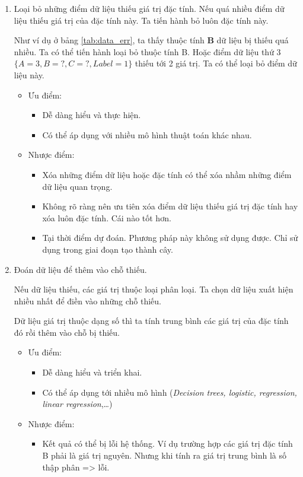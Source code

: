 \documentclass[../main-report.tex]{subfiles}
\begin{document}
\begin{enumerate}
\item Loại bỏ những điểm dữ liệu thiếu giá trị đặc tính. Nếu quá nhiều điểm dữ liệu thiếu giá trị của đặc tính này. Ta tiến hành bỏ luôn đặc tính này.

Như ví dụ ở bảng \ref{tab:data_err}, ta thấy thuộc tính \textbf{B} dữ liệu bị thiếu quá nhiều. Ta có thể tiến hành loại bỏ thuộc tính B. Hoặc điểm dữ liệu thứ 3 $\{A=3, B=?, C=?, Label=1 \}$ thiếu tới 2 giá trị. Ta có thể loại bỏ điểm dữ liệu này.

\begin{itemize}
\item Ưu điểm:
\begin{itemize}
\item Dễ dàng hiểu và thực hiện.
\item Có thể áp dụng với nhiều mô hình thuật toán khác nhau.
\end{itemize}
\item Nhược điểm:
\begin{itemize}
\item Xóa những điểm dữ liệu hoặc đặc tính có thể xóa nhầm những điểm dữ liệu quan trọng.
\item Không rõ ràng nên ưu tiên xóa điểm dữ liệu thiếu giá trị đặc tính hay xóa luôn đặc tính. Cái nào tốt hơn.
\item Tại thời điểm dự đoán. Phương pháp này không sử dụng được. Chỉ sử dụng trong giai đoạn tạo thành cây.
\end{itemize}
\end{itemize}

\item Đoán dữ liệu để thêm vào chỗ thiếu.

Nếu dữ liệu thiếu, các giá trị thuộc loại phân loại. Ta chọn dữ liệu xuất hiện nhiều nhất để điền vào những chỗ thiếu.

Dữ liệu giá trị thuộc dạng số thì ta tính trung bình các giá trị của đặc tính đó rồi thêm vào chỗ bị thiếu.

\begin{itemize}
\item Ưu điểm:
\begin{itemize}
\item Dễ dàng hiểu và triển khai.
\item Có thể áp dụng tới nhiều mô hình (\emph{Decision trees, logistic, regression, linear regression},\ldots)
\end{itemize}
\item Nhược điểm:
\begin{itemize}
\item Kết quả có thể bị lỗi hệ thống. Ví dụ trường hợp các giá trị đặc tính B phải là giá trị nguyên. Nhưng khi tính ra giá trị trung bình là số thập phân => lỗi.
\end{itemize}
\end{itemize}


\end{enumerate}
\end{document}
